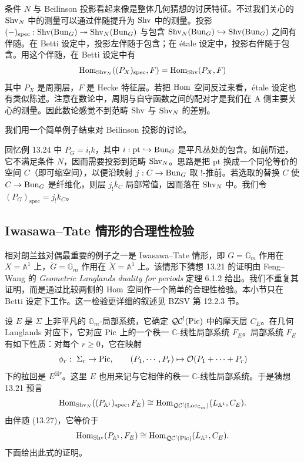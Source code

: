 条件 $N$ 与 Beilinson 投影看起来像是整体几何猜想的讨厌特征。不过我们关心的 $\operatorname{Shv}_N$ 中的测量可以通过伴随提升为 $\operatorname{Shv}$ 中的测量。投影 $(-)_{\mathrm{spec}}:\operatorname{Shv}(\operatorname{Bun}_G)\twoheadrightarrow\operatorname{Shv}_N(\operatorname{Bun}_G)$ 与包含 $\operatorname{Shv}_N(\operatorname{Bun}_G)\hookrightarrow\operatorname{Shv}(\operatorname{Bun}_G)$ 之间有伴随。在 Betti 设定中，投影左伴随于包含；在 étale 设定中，投影右伴随于包含。用这个伴随，在 Betti 设定中有
\begin{equation}
  \operatorname{Hom}_{\operatorname{Shv}_N}((P_X)_{\mathrm{spec}},F)=\operatorname{Hom}_{\operatorname{Shv}}(P_X,F)
  \label{eq:13-27}
\end{equation}
其中 $P_X$ 是周期层，$F$ 是 Hecke 特征层。若把 $\operatorname{Hom}$ 空间反过来看，étale 设定也有类似陈述。注意在数论中，周期与自守函数之间的配对才是我们在 A 侧主要关心的测量。因此数论感觉不到范畴 $\operatorname{Shv}$ 与 $\operatorname{Shv}_N$ 的差别。

我们用一个简单例子结束对 Beilinson 投影的讨论。

\begin{exmp}
回忆例 13.24 中 $P_G=i_!k$，其中 $i:\mathrm{pt}\hookrightarrow\operatorname{Bun}_G$ 是平凡丛处的包含。如前所述，它不满足条件 $N$，因而需要投影到范畴 $\operatorname{Shv}_N$。思路是把 $\mathrm{pt}$ 换成一个同伦等价的空间 $C$（即可缩空间），以便沿映射 $j:C\to\operatorname{Bun}_G$ 取 $!$-推前。若选取的替换 $C$ 使 $C\to\operatorname{Bun}_G$ 是纤维化，则层 $j_!k_C$ 局部常值，因而落在 $\operatorname{Shv}_N$ 中。我们令 $(P_G)_{\mathrm{spec}}=j_!k_C$。
\end{exmp}

\subsection{Iwasawa--Tate 情形的合理性检验}

相对朗兰兹对偶最重要的例子之一是 Iwasawa--Tate 情形，即 $G=\mathbb G_m$ 作用在 $X=\mathbb A^1$ 上，$\check G=\mathbb G_m$ 作用在 $\check X=\mathbb A^1$ 上。该情形下猜想 13.21 的证明由 Feng--Wang 的 \emph{Geometric Langlands duality for periods} 定理 6.1.2 给出。我们不重复其证明，而是通过比较两侧的 $\operatorname{Hom}$ 空间作一个简单的合理性检验。本小节只在 Betti 设定下工作。这一检验更详细的叙述见 BZSV 第 12.2.3 节。

设 $E$ 是 $\Sigma$ 上非平凡的 $\mathbb G_m$-局部系统，它确定 $\mathcal{QC}^!(\operatorname{Pic})$ 中的摩天层 $C_E$。在几何 Langlands 对应下，它对应 $\operatorname{Pic}$ 上的一个秩一 $\mathbb C$-线性局部系统 $F_E$。局部系统 $F_E$ 有如下性质：对每个 $r\ge0$，它在映射
\[
  \phi_r:\ \Sigma_r\to\operatorname{Pic},\qquad (P_1,\cdots,P_r)\mapsto\mathcal O(P_1+\cdots+P_r)
\]
下的拉回是 $E^{\boxtimes r}$。这里 $E$ 也用来记与它相伴的秩一 $\mathbb C$-线性局部系统。于是猜想 13.21 预言
\[
  \operatorname{Hom}_{\operatorname{Shv}_N}((P_{\mathbb A^1})_{\mathrm{spec}},F_E)\cong\operatorname{Hom}_{\mathcal{QC}^!(\operatorname{Loc}_{\mathbb G_m})}(L_{\mathbb A^1},C_E).
\]
由伴随 (13.27)，它等价于
\begin{equation}
  \operatorname{Hom}_{\operatorname{Shv}}(P_{\mathbb A^1},F_E)\cong\operatorname{Hom}_{\mathcal{QC}^!(\operatorname{Pic})}(L_{\mathbb A^1},C_E).
  \label{eq:13-29}
\end{equation}
下面给出此式的证明。

